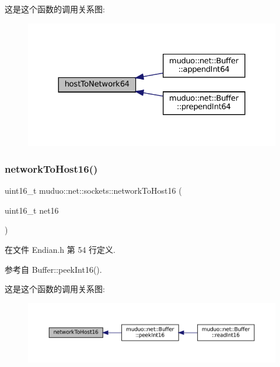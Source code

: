这是这个函数的调用关系图\+:
\nopagebreak
\begin{figure}[H]
\begin{center}
\leavevmode
\includegraphics[width=324pt]{namespacemuduo_1_1net_1_1sockets_ad0a6476a5e70fb475acf4e34f5a5f8cc_icgraph}
\end{center}
\end{figure}
\mbox{\label{namespacemuduo_1_1net_1_1sockets_a0f7768ebfa264d5c4eaf377297bab244}} 
\subsubsection{\texorpdfstring{network\+To\+Host16()}{networkToHost16()}}
{\footnotesize\ttfamily uint16\+\_\+t muduo\+::net\+::sockets\+::network\+To\+Host16 (\begin{DoxyParamCaption}\item[{uint16\+\_\+t}]{net16 }\end{DoxyParamCaption})\hspace{0.3cm}{\ttfamily [inline]}}



在文件 Endian.\+h 第 54 行定义.



参考自 Buffer\+::peek\+Int16().

这是这个函数的调用关系图\+:
\nopagebreak
\begin{figure}[H]
\begin{center}
\leavevmode
\includegraphics[width=350pt]{namespacemuduo_1_1net_1_1sockets_a0f7768ebfa264d5c4eaf377297bab244_icgraph}
\end{center}
\end{figure}
\mbox{\label{namespacemuduo_1_1net_1_1sockets_a23f7d77e0379e52b1390e1d2846624e0}} 
